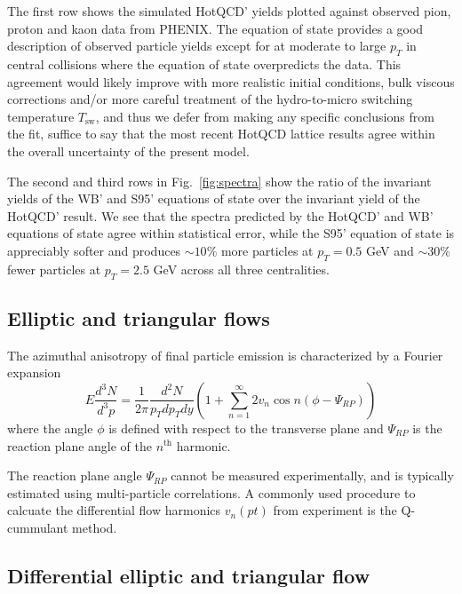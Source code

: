 \documentclass[aps,prc,reprint,amsmath,nofootinbib,superscriptaddress]{revtex4-1}
\begin{document}
The first row shows the simulated HotQCD' yields plotted against observed pion, proton and kaon data from PHENIX. The equation of state provides a good description of 
observed particle yields except for at moderate to large $p_T$ in central collisions where the equation of state overpredicts the data. This agreement would likely improve with more 
realistic initial conditions, bulk viscous corrections and/or more careful treatment of the hydro-to-micro switching temperature $T_\text{sw}$, and thus we defer from making any 
specific conclusions from the fit, suffice to say that the most recent HotQCD lattice results agree within the overall uncertainty of the present model. 

The second and third rows in Fig.~\ref{fig:spectra} show the ratio of the invariant yields of the WB' and S95' equations of state over the invariant yield of the HotQCD' result. We see 
that the spectra predicted by the HotQCD' and WB' equations of state agree within statistical error, while the S95' equation of state is appreciably softer and produces $\sim 10\%$ 
more particles at $p_T = 0.5$ GeV and $\sim 30\%$ fewer particles at $p_T=2.5$ GeV across all three centralities.

\subsection{Elliptic and triangular flows}
\label{flow}

The azimuthal anisotropy of final particle emission is characterized by a Fourier expansion
\begin{equation}
 E \frac{d^3N}{d^3p} = \frac{1}{2\pi} \frac{d^2N}{p_T dp_T dy} \left(1 + \sum\limits_{n=1}^\infty 2 v_n \cos n(\phi - \Psi_{RP}) \right)
\end{equation}
where the angle $\phi$ is defined with respect to the transverse plane and $\Psi_{RP}$ is the reaction plane angle of the $n^\text{th}$ harmonic.

The reaction plane angle $\Psi_{RP}$ cannot be measured experimentally, and is typically estimated using multi-particle correlations. A commonly used procedure to calcuate the
differential flow harmonics $v_n(pt)$ from experiment is the Q-cummulant method.


\subsection{Differential elliptic and triangular flow}
\label{flow}
\end{document}
